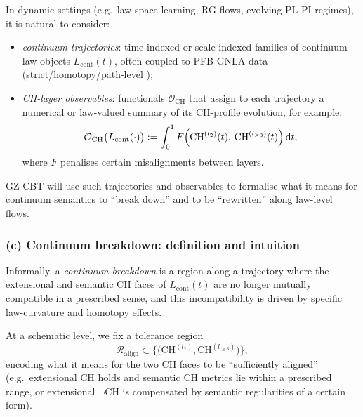 \documentclass[11pt]{book}
\theoremstyle{plain}
\theoremstyle{definition}
\begin{document}
In dynamic settings (e.g.\ law-space learning, RG flows, evolving PL-PI
regimes), it is natural to consider:

\begin{itemize}
  \item \emph{continuum trajectories}:
        time-indexed or scale-indexed families of continuum
        law-objects $L_{\mathrm{cont}}(t)$, often coupled to PFB-GNLA
        data (strict/homotopy/path-level \GAlgebra);
  \item \emph{CH-layer observables}:
        functionals $\mathcal{O}_{\mathrm{CH}}$ that assign to each
        trajectory a numerical or law-valued summary of its CH-profile
        evolution, for example:
        \[
           \mathcal{O}_{\mathrm{CH}}\bigl(L_{\mathrm{cont}}(\cdot)\bigr)
           :=
           \int_0^1
             F\Bigl(
               \mathrm{CH}^{(l_2)}(t),\,
               \mathrm{CH}^{(l_{\ge3})}(t)
             \Bigr)\,\mathrm{d}t,
        \]
        where $F$ penalises certain misalignments between layers.
\end{itemize}

GZ-CBT will use such trajectories and observables to formalise what it
means for continuum semantics to “break down” and to be “rewritten”
along law-level flows.



\subsubsection*{(c) Continuum breakdown: definition and intuition}

Informally, a \emph{continuum breakdown} is a region along a trajectory
where the extensional and semantic CH faces of $L_{\mathrm{cont}}(t)$
are no longer mutually compatible in a prescribed sense, and this
incompatibility is driven by specific law-curvature and homotopy
effects.

At a schematic level, we fix a tolerance region
\[
   \mathcal{R}_{\mathrm{align}}
   \subset
   \{\bigl(\mathrm{CH}^{(l_2)},\mathrm{CH}^{(l_{\ge3})}\bigr)\},
\]
encoding what it means for the two CH faces to be “sufficiently
aligned” (e.g.\ extensional CH holds and semantic CH metrics lie within
a prescribed range, or extensional $\neg\mathrm{CH}$ is compensated by
semantic regularities of a certain form).
\end{document}
